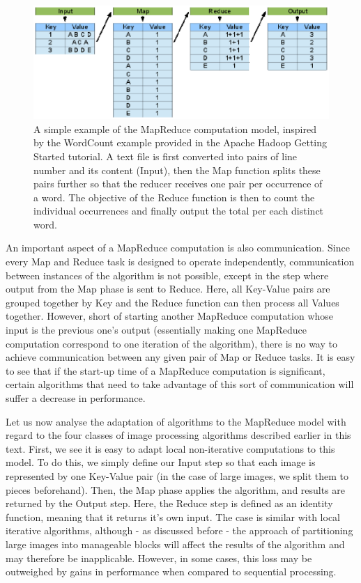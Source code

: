 \documentclass [12pt,a4paper]{report}
\begin{document}
\begin{figure}[h]
\begin{center}
\includegraphics[scale=0.5]{mapreduce.eps} %
\caption{A simple example of the MapReduce computation model, inspired by the WordCount example provided in the Apache Hadoop Getting Started tutorial. A text file is first converted into pairs of line number and its content (Input), then the Map function splits these pairs further so that the reducer receives one pair per occurrence of a word. The objective of the Reduce function is then to count the individual occurrences and finally output the total per each distinct word.}
\label{fig_mapreduce}
\end{center}
\end{figure}

An important aspect of a MapReduce computation is also communication. Since every Map and Reduce task is designed to operate independently, communication between instances of the algorithm is not possible, except in the step where output from the Map phase is sent to Reduce. Here, all Key-Value pairs are grouped together by Key and the Reduce function can then process all Values together. However, short of starting another MapReduce computation whose input is the previous one's output (essentially making one MapReduce computation correspond to one iteration of the algorithm), there is no way to achieve communication between any given pair of Map or Reduce tasks. It is easy to see that if the start-up time of a MapReduce computation is significant, certain algorithms that need to take advantage of this sort of communication will suffer a decrease in performance.

Let us now analyse the adaptation of algorithms to the MapReduce model with regard to the four classes of image processing algorithms described earlier in this text. First, we see it is easy to adapt local non-iterative computations to this model. To do this, we simply define our Input step so that each image is represented by one Key-Value pair (in the case of large images, we split them to pieces beforehand). Then, the Map phase applies the algorithm, and results are returned by the Output step. Here, the Reduce step is defined as an identity function, meaning that it returns it's own input. The case is similar with local iterative algorithms, although - as discussed before - the approach of partitioning large images into manageable blocks will affect the results of the algorithm and may therefore be inapplicable. However, in some cases, this loss may be outweighed by gains in performance when compared to sequential processing.
\end{document}
